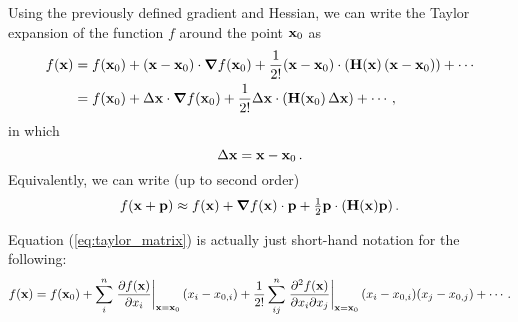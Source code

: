         Using the previously defined gradient and Hessian, we can write the Taylor expansion of the function $f$ around the point $\vb{x}_0$ as
        \begin{align}
            f(\vb{x}) &= f(\vb{x}_0) + (\vb{x} - \vb{x}_0) \cdot \grad{f(\vb{x}_0)} + \frac{1}{2!} (\vb{x} - \vb{x}_0) \cdot  (\vb{H}(\vb{x}) \thinspace (\vb{x} - \vb{x}_0)) + \cdots \label{eq:taylor_matrix} \\
            &= f(\vb{x}_0) + \Delta \vb{x} \cdot \grad{f(\vb{x}_0)} + \frac{1}{2!} \Delta \vb{x} \cdot (\vb{H}(\vb{x}_0) \thinspace \Delta \vb{x}) + \cdots \thinspace ,
        \end{align}
        in which
        \begin{equation}
            \Delta \vb{x} = \vb{x} - \vb{x}_0 \thinspace .
        \end{equation}
        Equivalently, we can write (up to second order)
        \begin{equation} \label{eq:second_order_Taylor}
            f(\vb{x} + \vb{p}) \approx f(\vb{x}) + \grad{f(\vb{x})} \cdot \vb{p} + \tfrac{1}{2} \vb{p} \cdot \qty(\vb{H}(\vb{x}) \vb{p}) \thinspace .
        \end{equation}

        Equation (\ref{eq:taylor_matrix}) is actually just short-hand notation for the following:
        \begin{equation}
            f(\vb{x}) = f(\vb{x}_0) + \sum_i^n \eval{\pdv{f(\vb{x})}{x_i}}_{\vb{x}=\vb{x}_0} (x_i - x_{0,i}) + \frac{1}{2!} \sum_{ij}^n \eval{\pdv{f(\vb{x})}{x_i}{x_j}}_{\vb{x}=\vb{x}_0} (x_i - x_{0,i}) (x_j - x_{0,j}) + \cdots \thinspace .
        \end{equation}

